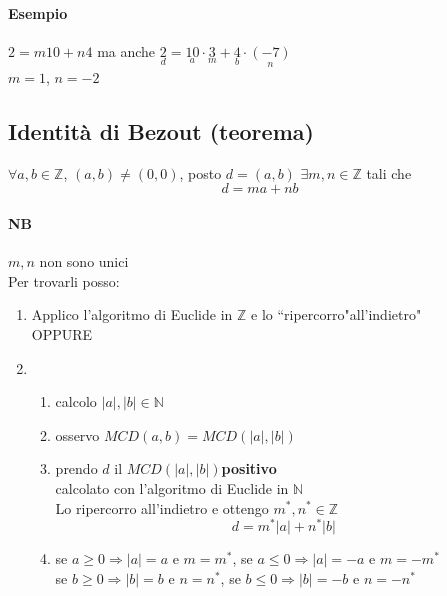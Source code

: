     \paragraph{Esempio} $2=m10+n4$ ma anche 
    $\underset{d}{2}=\underset{a}{10}\cdot\underset{m}{3}+\underset{b}{4}\cdot\underset{n}{(-7)}$\\
    $m=1$, $n=-2$
    {\color{red} \subsection{Identità di Bezout (teorema)}}
    $\forall a,b\in\mathbb{Z}$, $(a,b)\neq (0,0)$, posto $d=(a,b)$
    $\exists m,n\in\mathbb{Z}$ tali che
    $$d=ma+nb$$
    \paragraph{NB} $m,n$ non sono unici\\
    Per trovarli posso:
    \begin{enumerate}
        \item Applico l'algoritmo di Euclide in $\mathbb{Z}$ e lo ``ripercorro"all'indietro"\\
            OPPURE
        \item 
            \begin{enumerate}
                \item calcolo $|a|,|b|\in\mathbb{N}$
                \item osservo $MCD(a,b)=MCD(|a|,|b|)$
                \item prendo $d$ il $MCD(|a|,|b|)$\textbf{positivo}\\
                    calcolato con l'algoritmo di Euclide in $\mathbb{N}$\\
                    Lo ripercorro all'indietro e ottengo $m^*, n^*\in\mathbb{Z}$
                    $$d=m^*|a|+n^*|b|$$
                \item se $a\geq 0\Rightarrow |a|=a$ e $m=m^*$,
                    {\color{red} se $a\leq 0\Rightarrow |a|=-a$ e $m=-m^* $}\\
                    se $b\geq 0\Rightarrow |b|=b$ e $n=n^*$,
                    {\color{red} se $b\leq 0\Rightarrow |b|=-b$ e $n=-n^* $}
            \end{enumerate}
    \end{enumerate}
